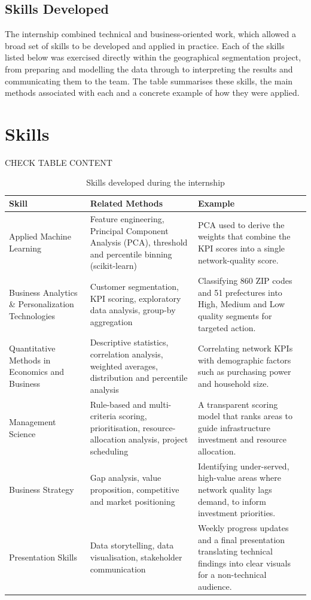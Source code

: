 \documentclass[12pt, a4paper, oneside]{report}
\begin{document}
\section{Skills Developed}
The internship combined technical and business-oriented work, which allowed a broad set of skills to be developed and applied in practice. Each of the skills listed below was exercised directly within the geographical segmentation project, from preparing and modelling the data through to interpreting the results and communicating them to the team. The table summarises these skills, the main methods associated with each and a concrete example of how they were applied.

\chapter{Skills}
CHECK TABLE CONTENT

\begin{table}[h]
\centering
\renewcommand{\arraystretch}{1.4}
\begin{tabularx}{\textwidth}{p{3.1cm} X X}
\hline
\textbf{Skill} & \textbf{Related Methods} & \textbf{Example} \\
\hline
Applied Machine Learning & Feature engineering, Principal Component Analysis (PCA), threshold and percentile binning (scikit-learn) & PCA used to derive the weights that combine the KPI scores into a single network-quality score. \\
Business Analytics \& Personalization Technologies & Customer segmentation, KPI scoring, exploratory data analysis, group-by aggregation & Classifying 860 ZIP codes and 51 prefectures into High, Medium and Low quality segments for targeted action. \\
Quantitative Methods in Economics and Business & Descriptive statistics, correlation analysis, weighted averages, distribution and percentile analysis & Correlating network KPIs with demographic factors such as purchasing power and household size. \\
Management Science & Rule-based and multi-criteria scoring, prioritisation, resource-allocation analysis, project scheduling & A transparent scoring model that ranks areas to guide infrastructure investment and resource allocation. \\
Business Strategy & Gap analysis, value proposition, competitive and market positioning & Identifying under-served, high-value areas where network quality lags demand, to inform investment priorities. \\
Presentation Skills & Data storytelling, data visualisation, stakeholder communication & Weekly progress updates and a final presentation translating technical findings into clear visuals for a non-technical audience. \\
\hline
\end{tabularx}
\caption{Skills developed during the internship}
\label{tab:skills}
\end{table}
\end{document}
